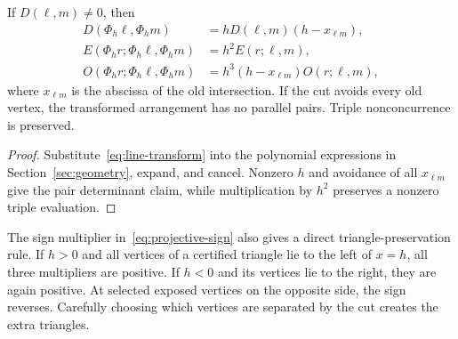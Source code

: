\begin{lemma}\label{lem:projective-covariance}
If $D(\ell,m)\ne0$, then
\begin{align}
D(\Phi_h\ell,\Phi_hm)&=hD(\ell,m)(h-x_{\ell m}),\\
E(\Phi_hr;\Phi_h\ell,\Phi_hm)&=h^2E(r;\ell,m),\\
O(\Phi_hr;\Phi_h\ell,\Phi_hm)&=h^3(h-x_{\ell m})O(r;\ell,m),\label{eq:projective-sign}
\end{align}
where $x_{\ell m}$ is the abscissa of the old intersection. If the cut avoids every old vertex, the transformed arrangement has no parallel pairs. Triple nonconcurrence is preserved.
\end{lemma}
\begin{proof}
Substitute~\eqref{eq:line-transform} into the polynomial expressions in Section~\ref{sec:geometry}, expand, and cancel. Nonzero $h$ and avoidance of all $x_{\ell m}$ give the pair determinant claim, while multiplication by $h^2$ preserves a nonzero triple evaluation.
\end{proof}

The sign multiplier in~\eqref{eq:projective-sign} also gives a direct triangle-preservation rule. If $h>0$ and all vertices of a certified triangle lie to the left of $x=h$, all three multipliers are positive. If $h<0$ and its vertices lie to the right, they are again positive. At selected exposed vertices on the opposite side, the sign reverses. Carefully choosing which vertices are separated by the cut creates the extra triangles.

